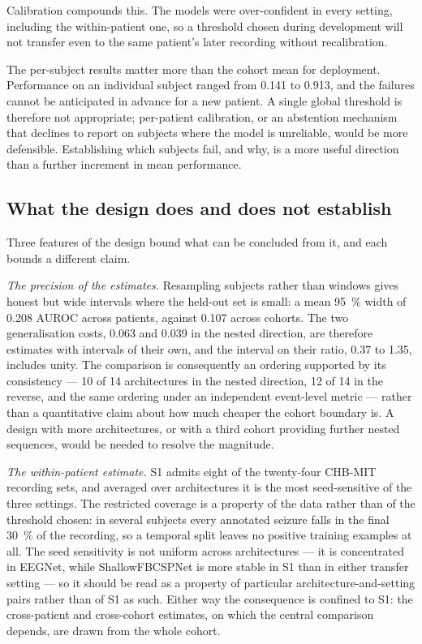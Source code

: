 \documentclass[11pt,a4paper]{article}
\begin{document}
Calibration compounds this. The models were over-confident in every setting,
including the within-patient one, so a threshold chosen during development
will not transfer even to the same patient's later recording without
recalibration.

The per-subject results matter more than the cohort mean for deployment.
Performance on an individual subject ranged from 0.141 to 0.913, and the
failures cannot be anticipated in advance for a new patient. A single global
threshold is therefore not appropriate; per-patient calibration, or an
abstention mechanism that declines to report on subjects where the model is
unreliable, would be more defensible. Establishing which subjects fail, and
why, is a more useful direction than a further increment in mean performance.

\subsection{What the design does and does not establish}

Three features of the design bound what can be concluded from it, and each
bounds a different claim.

\emph{The precision of the estimates.} Resampling subjects rather than
windows gives honest but wide intervals where the held-out set is small: a
mean \SI{95}{\percent} width of 0.208 AUROC across patients, against 0.107
across cohorts. The two generalisation costs, 0.063 and 0.039 in the nested
direction, are therefore estimates with intervals of their own, and the
interval on their ratio, 0.37 to 1.35, includes unity. The comparison is
consequently an ordering supported by its consistency --- 10 of 14
architectures in the nested direction, 12 of 14 in the reverse, and the same
ordering under an independent event-level metric --- rather than a
quantitative claim about how much cheaper the cohort boundary is. A design
with more architectures, or with a third cohort providing further nested
sequences, would be needed to resolve the magnitude.

\emph{The within-patient estimate.} S1 admits eight of the twenty-four
CHB-MIT recording sets, and averaged over architectures it is the most seed-sensitive of
the three settings. The restricted coverage is a property of the data rather
than of the threshold chosen: in several subjects every annotated seizure
falls in the final \SI{30}{\percent} of the recording, so a temporal split
leaves no positive training examples at all. The seed sensitivity is not
uniform across architectures --- it is concentrated in EEGNet, while
ShallowFBCSPNet is more stable in S1 than in either transfer setting --- so
it should be read as a property of particular architecture-and-setting pairs
rather than of S1 as such. Either way the consequence is confined to S1: the
cross-patient and cross-cohort estimates, on which the central comparison
depends, are drawn from the whole cohort.
\end{document}
